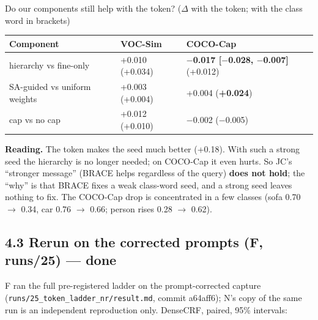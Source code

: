 \documentclass[
  10pt,
]{article}
\newcounter{none} %
\begin{document}
Do our components still help with the token? (\ensuremath{\Delta} with the token; with the
class word in brackets)

{\def\LTcaptype{none} %
\begin{longtable}[]{@{}
  >{\raggedright\arraybackslash}p{}
  >{\raggedright\arraybackslash}p{}
  >{\raggedright\arraybackslash}p{}@{}}
\toprule\noalign{}
\begin{minipage}[b]{\linewidth}\raggedright
Component
\end{minipage} & \begin{minipage}[b]{\linewidth}\raggedright
VOC-Sim
\end{minipage} & \begin{minipage}[b]{\linewidth}\raggedright
COCO-Cap
\end{minipage} \\
\midrule\noalign{}
\endhead
\bottomrule\noalign{}
\endlastfoot
hierarchy vs fine-only & +0.010 (+0.034) & \textbf{\ensuremath{-}0.017 {[}\ensuremath{-}0.028,
\ensuremath{-}0.007{]}} (+0.012) \\
SA-guided vs uniform weights & +0.003 (+0.004) & +0.004
(\textbf{+0.024}) \\
cap vs no cap & +0.012 (+0.010) & \ensuremath{-}0.002 (\ensuremath{-}0.005) \\
\end{longtable}
}

\textbf{Reading.} The token makes the seed much better (+0.18). With
such a strong seed the hierarchy is no longer needed; on COCO-Cap it
even hurts. So JC's ``stronger message'' (BRACE helps regardless of the
query) \textbf{does not hold}; the ``why'' is that BRACE fixes a weak
class-word seed, and a strong seed leaves nothing to fix. The COCO-Cap
drop is concentrated in a few classes (sofa 0.70 \ensuremath{\rightarrow} 0.34, car 0.76 \ensuremath{\rightarrow}
0.66; person rises 0.28 \ensuremath{\rightarrow} 0.62).

\subsection{4.3 Rerun on the corrected prompts (F, runs/25) --- done}

F ran the full pre-registered ladder on the prompt-corrected capture
(\texttt{runs/25\_token\_ladder\_nr/result.md}, commit a64aff6); N's
copy of the same run is an independent reproduction only. DenseCRF,
paired, 95\% intervals:
\end{document}
